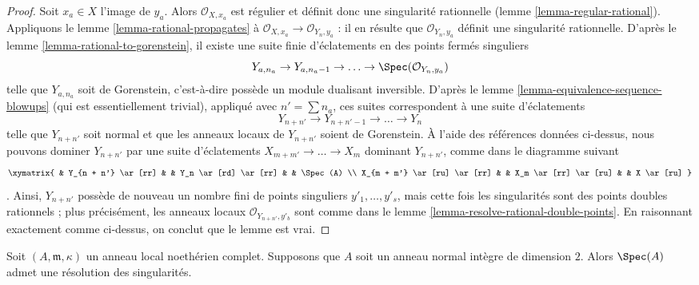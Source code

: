 \begin{proof}
\medskip\noindent Soit $x_a \in X$ l'image de $y_a$. Alors $\mathcal{O}_{X, x_a}$ est régulier et définit donc une singularité rationnelle (lemme \ref{lemma-regular-rational}). Appliquons le lemme \ref{lemma-rational-propagates} à $\mathcal{O}_{X, x_a} \to \mathcal{O}_{Y_n, y_a}$ : il en résulte que $\mathcal{O}_{Y_n, y_a}$ définit une singularité rationnelle. D'après le lemme \ref{lemma-rational-to-gorenstein}, il existe une suite finie d'éclatements en des points fermés singuliers $$
Y_{a, n_a} \to Y_{a, n_a - 1} \to \ldots \to \Spec(\mathcal{O}_{Y_n, y_a})
$$ telle que $Y_{a, n_a}$ soit de Gorenstein, c'est-à-dire possède un module dualisant inversible. D'après le lemme \ref{lemma-equivalence-sequence-blowups} (qui est essentiellement trivial), appliqué avec $n' = \sum n_a$, ces suites correspondent à une suite d'éclatements $$
Y_{n + n'} \to Y_{n + n' - 1} \to \ldots \to Y_n
$$ telle que $Y_{n + n'}$ soit normal et que les anneaux locaux de $Y_{n + n'}$ soient de Gorenstein. À l'aide des références données ci-dessus, nous pouvons dominer $Y_{n + n'}$ par une suite d'éclatements $X_{m + m'} \to \ldots \to X_m$ dominant $Y_{n + n'}$, comme dans le diagramme suivant $$
\xymatrix{
 & Y_{n + n'} \ar[rr] & & Y_n \ar[rd] \ar[rr] & & \Spec(A) \\
X_{m + m'} \ar[ru] \ar[rr] & & X_m \ar[rr] \ar[ru] & & X \ar[ru]
}
$$. Ainsi, $Y_{n + n'}$ possède de nouveau un nombre fini de points singuliers $y'_1, \ldots, y'_s$, mais cette fois les singularités sont des points doubles rationnels ; plus précisément, les anneaux locaux $\mathcal{O}_{Y_{n + n'}, y'_b}$ sont comme dans le lemme \ref{lemma-resolve-rational-double-points}. En raisonnant exactement comme ci-dessus, on conclut que le lemme est vrai. \end{proof}

\begin{lemma} \label{lemma-resolve-complete} Soit $(A, \mathfrak m, \kappa)$ un anneau local noethérien complet. Supposons que $A$ soit un anneau normal intègre de dimension $2$. Alors $\Spec(A)$ admet une résolution des singularités. \end{lemma}

